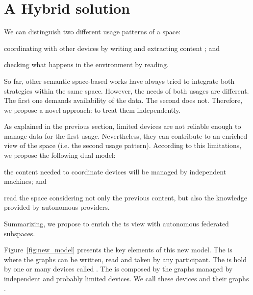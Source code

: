 \section{A Hybrid solution} %
\label{sec:hybrid_solution}

We can distinguish two different usage patterns of a space:
\begin{enumerate*}[label=\itshape(\arabic*\upshape)]
  \item coordinating with other devices by writing and extracting content ; and %
  \item checking what happens in the environment by reading.
\end{enumerate*}
So far, other semantic space-based works have always tried to integrate both strategies within the same space.
However, the needs of both usages are different.
The first one demands availability of the data.
The second does not. %
Therefore, we propose a novel approach: to treat them independently.



As explained in the previous section, limited devices are not reliable enough to manage data for the first usage.
Nevertheless, they can contribute to an enriched view of the space (i.e. the second usage pattern).
According to this limitations, we propose the following dual model:
\begin{enumerate*}[label=\itshape(\arabic*\upshape)]
  \item the content needed to coordinate devices will be managed by independent machines; and
  \item read the space considering not only the previous content, but also the knowledge provided by autonomous providers.
\end{enumerate*}
Summarizing, we propose to enrich the \ac{ts} view with autonomous federated subspaces.


Figure~\ref{fig:new_model} presents the key elements of this new model.
The \coordspace{} is where the graphs can be written, read and taken by any participant.
The \coordspace{} is hold by one or many devices called \coordinators{}.
The \outerspace{} is composed by the graphs managed by independent and probably limited devices.
We call these devices \asteroids{} and their graphs \selfgraphs{}.

